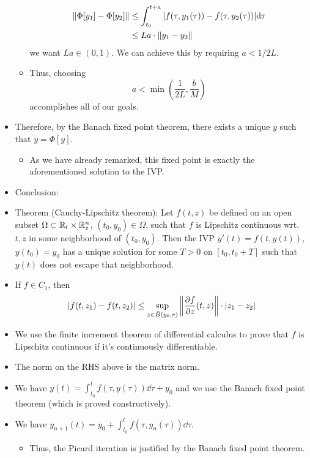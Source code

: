 \documentclass[../notes.tex]{subfiles}
\begin{document}
\begin{itemize}
\begin{itemize}
        \begin{align*}
            \norm{\Phi[y_1]-\Phi[y_2]} &\leq \int_{t_0}^{t+a}|f(\tau,y_1(\tau))-f(\tau,y_2(\tau))|\dd\tau\\
            &\leq La\cdot\norm{y_1-y_2}
        \end{align*}
        we want $La\in(0,1)$. We can achieve this by requiring $a<1/2L$.
        \item Thus, choosing
        \begin{equation*}
            a < \min\left( \frac{1}{2L},\frac{b}{M} \right)
        \end{equation*}
        accomplishes all of our goals.
    \end{itemize}
    \item Therefore, by the Banach fixed point theorem, there exists a unique $y$ such that $y=\Phi[y]$.
    \begin{itemize}
        \item As we have already remarked, this fixed point is exactly the aforementioned solution to the IVP.
    \end{itemize}
    \item Conclusion:
    \item Theorem (Cauchy-Lipschitz theorem): Let $f(t,z)$ be defined on an open subset $\Omega\subset\mathbb{R}_t\times\mathbb{R}_z^n$, $(t_0,y_0)\in\Omega$, such that $f$ is Lipschitz continuous wrt. $t,z$ in some neighborhood of $(t_0,y_0)$. Then the IVP $y'(t)=f(t,y(t))$, $y(t_0)=y_0$ has a unique solution for some $T>0$ on $[t_0,t_0+T]$ such that $y(t)$ does not escape that neighborhood.
    \item If $f\in C_1$, then
    \begin{equation*}
        |f(t,z_1)-f(t,z_2)| \leq \sup_{z\in\bar{B}(y_0,r)}\norm{{\pdv{f}{z}}(t,z)}\cdot|z_1-z_2|
    \end{equation*}
    \item We use the finite increment theorem of differential calculus to prove that $f$ is Lipschitz continuous if it's continuously differentiable.
    \item The norm on the RHS above is the matrix norm.
    \item We have $y(t)=\int_{t_0}^tf(\tau,y(\tau))\dd\tau+y_0$ and we use the Banach fixed point theorem (which is proved constructively).
    \item We have $y_{n+1}(t)=y_0+\int_{t_0}^tf(\tau,y_n(\tau))\dd\tau$.
    \begin{itemize}
        \item Thus, the Picard iteration is justified by the Banach fixed point theorem.

\end{itemize}
\end{itemize}
\end{document}
